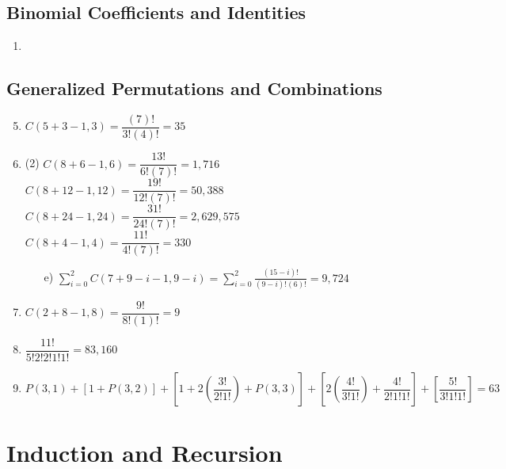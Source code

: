 \documentclass[12pt, A4]{article}
\begin{document}
		\subsection{Binomial Coefficients and Identities}
			\begin{enumerate}
				\item
			\end{enumerate}
		\subsection{Generalized Permutations and Combinations}
			\begin{enumerate}
				\setcounter{enumi}{4}
				\item
					\(C(5 + 3 - 1, 3) = \dfrac{(7)!}{3!(4)!} = 35\)
				\setcounter{enumi}{8}
				\item
					\begin{tasks}(2)
						\task
							\(C(8 + 6 - 1, 6) = \dfrac{13!}{6!(7)!} = 1,716\)	
						\task
							\(C(8 + 12 - 1, 12) = \dfrac{19!}{12!(7)!} = 50,388\)
						\task
							\(C(8 + 24 - 1, 24) = \dfrac{31!}{24!(7)!} = 2,629,575\)
						\task
							\(C(8 + 4 - 1, 4) = \dfrac{11!}{4!(7)!} = 330\)
					\end{tasks}
					\begin{itemize}[leftmargin = 1.04cm]
						\item[e)]
							\(\displaystyle \sum_{i = 0}^{2} C(7 + 9 - i - 1, 9 - i) = \sum_{i = 0}^2 \frac{(15 - i)!}{(9 - i)!(6)!} = 9,724\)	
					\end{itemize}
				\setcounter{enumi}{10}
				\item
					\(C(2 + 8 - 1, 8) = \dfrac{9!}{8!(1)!} = 9\)
				\setcounter{enumi}{32}
				\item
					\(\dfrac{11!}{5!2!2!1!1!} = 83,160\)
				\setcounter{enumi}{34}
				\item
					\(P(3, 1) + [1 + P(3, 2)] + \left[1 + 2\left(\dfrac{3!}{2!1!}\right) + P(3, 3)\right] + \left[2\left(\dfrac{4!}{3!1!}\right) + \dfrac{4!}{2!1!1!}\right] + \left[\dfrac{5!}{3!1!1!}\right] = 63\)
			\end{enumerate}
	\setcounter{section}{4}
	\section{Induction and Recursion}
\end{document}
